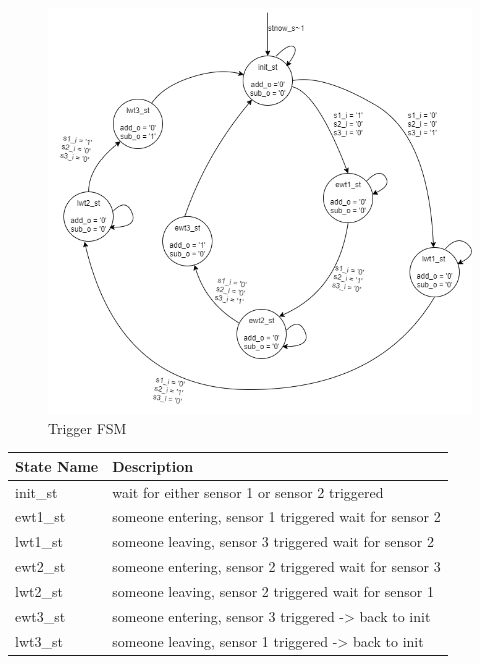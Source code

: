 \documentclass[12pt,a4 paper] {report}
\begin{document}
\begin{figure}[h]
	\centering	
	\includegraphics[scale=0.4]{../png/trigger.png}
	\caption{Trigger FSM}
\end{figure}
\begin{center}
 \begin{tabular}{| p{4cm} | p{7cm} |}
	 \hline
	 \textbf{State Name} & \textbf{Description} \\
	 \hline
	 init\_st & wait for either sensor 1 or sensor 2 triggered \\
	 \hline
	 ewt1\_st & someone entering, sensor 1 triggered wait for sensor 2 \\
	 \hline
	 lwt1\_st & someone leaving, sensor 3 triggered wait for sensor 2 \\
	 \hline
	 ewt2\_st & someone entering, sensor 2 triggered wait for sensor 3 \\
	 \hline
	 lwt2\_st & someone leaving, sensor 2 triggered wait for sensor 1 \\
	 \hline
	 ewt3\_st & someone entering, sensor 3 triggered -> back to init \\
	 \hline
	 lwt3\_st & someone leaving, sensor 1 triggered -> back to init \\
	 \hline
 \end{tabular}
\end{center}

\newpage
\end{document}

